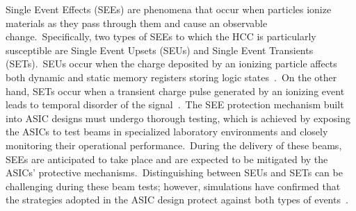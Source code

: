 \documentclass[a4paper,11pt]{article}
\begin{document}
Single Event Effects (SEEs) are phenomena that occur when particles ionize materials as they pass through them and cause an observable change.\ Specifically, two types of SEEs to which the HCC is particularly susceptible are Single Event Upsets (SEUs) and Single Event Transients (SETs).\ SEUs occur when the charge deposited by an ionizing particle affects both dynamic and static memory registers storing logic states~\cite{karnik2004characterization}.\ On the other hand, SETs occur when a transient charge pulse generated by an ionizing event leads to temporal disorder of the signal~\cite{ferlet2013single}.\ The SEE protection mechanism built into ASIC designs must undergo thorough testing, which is achieved by exposing the ASICs to test beams in specialized laboratory environments and closely monitoring their operational performance.\ During the delivery of these beams, SEEs are anticipated to take place and are expected to be mitigated by the ASICs' protective mechanisms.\ Distinguishing between SEUs and SETs can be challenging during these beam tests; however, simulations have confirmed that the strategies adopted in the ASIC design protect against both types of events~\cite{ashmanskas2023verification}.



\end{document}
